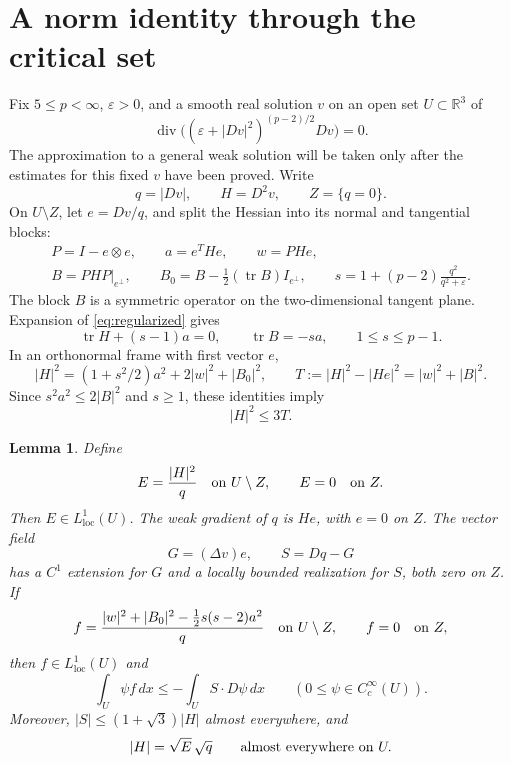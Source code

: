 \documentclass[11pt]{article}
\newtheorem{lemma}[theorem]{Lemma}
\theoremstyle{remark}
\newcommand{\R}{\mathbb R}
\newcommand{\loc}{\mathrm{loc}}
\newcommand{\dd}{\,dx}
\newcommand{\tr}{\operatorname{tr}}
\newcommand{\diver}{\operatorname{div}}
\newcommand{\eps}{\varepsilon}
\begin{document}
\section{A norm identity through the critical set}\label{sec:critical}

Fix $5\leq p<\infty$, $\eps>0$, and a smooth real solution $v$ on an open set $U\subset\R^3$
of
\begin{equation}\label{eq:regularized}
 \diver\bigl((\eps+|Dv|^2)^{(p-2)/2}Dv\bigr)=0.
\end{equation}
The approximation to a general weak solution will be taken only
after the estimates for this fixed $v$ have been proved.
Write
\[
 q=|Dv|,\qquad H=D^2v,\qquad Z=\{q=0\}.
\]
On $U\setminus Z$, let $e=Dv/q$, and split the Hessian into its
normal and tangential blocks:
\begin{equation}\label{eq:blocks}
\begin{gathered}
 P=I-e\otimes e,\qquad a=e^THe,\qquad w=PHe,\\
 B=PHP\big|_{e^\perp},\qquad
 B_0=B-\tfrac12(\tr B)I_{e^\perp},\qquad
 s=1+(p-2)\frac{q^2}{q^2+\eps}.
\end{gathered}
\end{equation}
The block $B$ is a symmetric operator on the two-dimensional
tangent plane. Expansion of \eqref{eq:regularized} gives
\begin{equation}\label{eq:trace}
 \tr H+(s-1)a=0,\qquad \tr B=-sa,\qquad 1\leq s\leq p-1.
\end{equation}
In an orthonormal frame with first vector $e$,
\begin{equation}\label{eq:decomposition}
 |H|^2=(1+s^2/2)a^2+2|w|^2+|B_0|^2,\qquad
 T:=|H|^2-|He|^2=|w|^2+|B|^2.
\end{equation}
Since $s^2a^2\leq2|B|^2$ and $s\geq1$, these identities imply
\begin{equation}\label{eq:kato}
 |H|^2\leq3T.
\end{equation}

\begin{lemma}\label{lem:critical}
Define
\[
 E=\frac{|H|^2}{q}\quad\hbox{on }U\setminus Z,\qquad E=0\quad\hbox{on }Z.
\]
Then $E\in L^1_{\loc}(U)$. The weak gradient of $q$ is $He$,
with $e=0$ on $Z$. The vector field
\[
 G=(\Delta v)e,\qquad S=Dq-G
\]
has a $C^1$ extension for $G$ and a locally bounded realization for
$S$, both zero on $Z$. If
\begin{equation}\label{eq:f}
 f=\frac{|w|^2+|B_0|^2-\tfrac12s(s-2)a^2}{q}
 \quad\hbox{on }U\setminus Z,\qquad f=0\quad\hbox{on }Z,
\end{equation}
then $f\in L^1_{\loc}(U)$ and
\begin{equation}\label{eq:critical}
 \int_U \psi f\dd\leq-\int_U S\cdot D\psi\dd
 \qquad(0\leq\psi\in C_c^\infty(U)).
\end{equation}
Moreover, $|S|\leq(1+\sqrt3)|H|$ almost everywhere, and
\begin{equation}\label{eq:zeroidentity}
 |H|=\sqrt E\,\sqrt q\qquad\hbox{almost everywhere on }U.
\end{equation}
\end{lemma}
\end{document}
